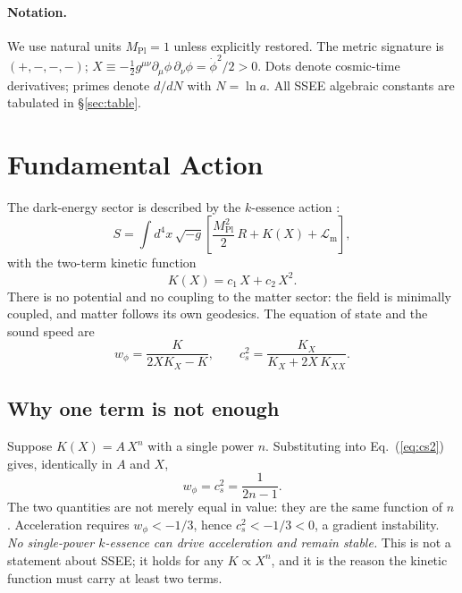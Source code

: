\documentclass[12pt,a4paper]{article}
\newcommand{\Mpl}{M_{\mathrm{Pl}}}
\newcommand{\half}{\tfrac{1}{2}}
\begin{document}
\paragraph{Notation.}
We use natural units $\Mpl = 1$ unless explicitly restored.
The metric signature is $(+,-,-,-)$; $X \equiv -\half g^{\mu\nu}
\partial_\mu\phi\,\partial_\nu\phi = \dot\phi^2/2 > 0$.
Dots denote cosmic-time derivatives; primes denote $d/dN$ with
$N = \ln a$.  All SSEE algebraic constants are tabulated in §\ref{sec:table}.

\section{Fundamental Action}
\label{sec:action}

The dark-energy sector is described by the $k$-essence action
\citep{ArmendarizPicon2001}:
%
\begin{equation}
  S = \int d^{4}x\,\sqrt{-g}
      \left[\frac{\Mpl^{2}}{2}\,R
            + K(X)
            + \mathcal{L}_{\mathrm{m}}
      \right],
  \label{eq:accion}
\end{equation}
%
with the two-term kinetic function
%
\begin{equation}
  K(X) = c_1\,X + c_2\,X^{2}.
  \label{eq:KX}
\end{equation}
%
There is no potential and no coupling to the matter sector: the field is
minimally coupled, and matter follows its own geodesics.
The equation of state and the sound speed are
%
\begin{equation}
  w_\phi = \frac{K}{2XK_X - K},
  \qquad
  c_s^{2} = \frac{K_X}{K_X + 2X\,K_{XX}}.
  \label{eq:cs2}
\end{equation}

\subsection{Why one term is not enough}

Suppose $K(X) = A\,X^{n}$ with a single power $n$.  Substituting into
Eq.~(\ref{eq:cs2}) gives, identically in $A$ and $X$,
%
\begin{equation}
  w_\phi = c_s^{2} = \frac{1}{2n-1}.
  \label{eq:power_law}
\end{equation}
%
The two quantities are not merely equal in value: they are the same
function of $n$.  Acceleration requires $w_\phi < -1/3$, hence
$c_s^2 < -1/3 < 0$, a gradient instability.  \emph{No single-power
$k$-essence can drive acceleration and remain stable.}  This is not a
statement about SSEE; it holds for any $K \propto X^n$, and it is the
reason the kinetic function must carry at least two terms.
\end{document}
